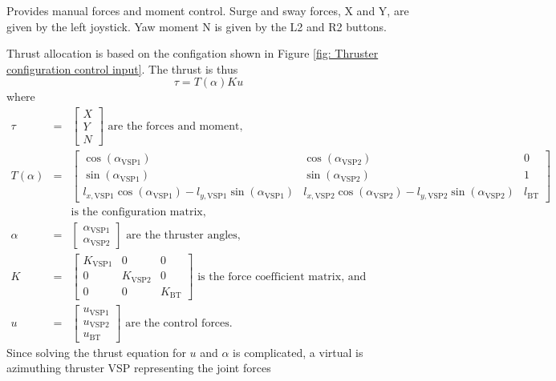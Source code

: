 \documentclass[a4paper,twoside,english]{report}
\begin{document}
Provides manual forces and moment control. Surge and sway forces,
X and Y, are given by the left joystick. Yaw moment N is given by
the L2 and R2 buttons.

Thrust allocation is based on the configation shown in Figure \ref{fig: Thruster configuration control input}.
The thrust is thus
\[
\tau=T\left(\alpha\right)Ku
\]
where
\begin{eqnarray*}
\tau & = & \left[\begin{array}{c}
X\\
Y\\
N
\end{array}\right]\text{ are the forces and moment},\\
T\left(\alpha\right) & = & \left[\begin{array}{ccc}
\cos\left(\alpha_{\text{VSP1}}\right) & \cos\left(\alpha_{\text{VSP2}}\right) & 0\\
\sin\left(\alpha_{\text{VSP1}}\right) & \sin\left(\alpha_{\text{VSP2}}\right) & 1\\
l_{x,\text{VSP1}}\cos\left(\alpha_{\text{VSP1}}\right)-l_{y,\text{VSP1}}\sin\left(\alpha_{\text{VSP1}}\right) & l_{x,\text{VSP2}}\cos\left(\alpha_{\text{VSP2}}\right)-l_{y,\text{VSP2}}\sin\left(\alpha_{\text{VSP2}}\right) & l_{\text{BT}}
\end{array}\right]\\
 &  & \text{is the configuration matrix,}\\
\alpha & = & \left[\begin{array}{c}
\alpha_{\text{VSP1}}\\
\alpha_{\text{VSP2}}
\end{array}\right]\text{ are the thruster angles},\\
K & = & \left[\begin{array}{ccc}
K_{\text{VSP1}} & 0 & 0\\
0 & K_{\text{VSP2}} & 0\\
0 & 0 & K_{\text{BT}}
\end{array}\right]\text{ is the force coefficient matrix, and}\\
u & = & \left[\begin{array}{c}
u_{\text{VSP1}}\\
u_{\text{VSP2}}\\
u_{\text{BT}}
\end{array}\right]\text{ are the control forces.}
\end{eqnarray*}
Since solving the thrust equation for $u$ and $\alpha$ is complicated,
a virtual is azimuthing thruster VSP representing the joint forces
\end{document}
